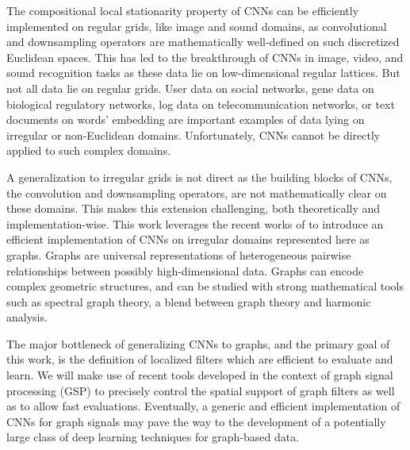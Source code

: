 \documentclass{article}
\begin{document}
The compositional local stationarity property of CNNs can be efficiently
implemented on regular grids, like image and sound domains, as convolutional and
downsampling operators are mathematically well-defined on such discretized
Euclidean spaces. This has led to the breakthrough of CNNs in image, video, and
sound recognition tasks \cite{art:LeCunBengioHinton15DL} as these data lie on
low-dimensional regular lattices. But not all data lie on regular grids. User
data on social networks, gene data on biological regulatory networks, log data
on telecommunication networks, or text documents on words' embedding are
important examples of data lying on irregular or non-Euclidean domains.
Unfortunately, CNNs cannot be directly applied to such complex domains.

A generalization to irregular grids is not direct as the building blocks of
CNNs, the convolution and downsampling operators, are not mathematically clear
on these domains. This makes this extension challenging, both theoretically and
implementation-wise. This work leverages the recent works of
\cite{pro:GregorLeCun10LRF, pro:CoatesNg11LRF,
art:BrunaZarembaSzlamLeCun13DLgraphs, art:HenaffBrunaLeCun15DLgraphs,
art:HammondVandergheynstGribonval11GraphWav,
art:ShumanNarangFrossardOrtegaVandergheynst13ReviewSPG} to introduce an
efficient implementation of CNNs on irregular domains represented here as
graphs. Graphs are universal representations of heterogeneous pairwise
relationships between possibly high-dimensional data. Graphs can encode complex
geometric structures, and can be studied with strong mathematical tools such as
spectral graph theory, a blend between graph theory and harmonic analysis.

The major bottleneck of generalizing CNNs to graphs, and the primary goal of
this work, is the definition of localized filters which are efficient to
evaluate and learn.
We will make use of recent tools developed in the context of graph signal
processing (GSP) \cite{art:ShumanNarangFrossardOrtegaVandergheynst13ReviewSPG}
to precisely control the spatial support of graph filters as well as to allow
fast evaluations. Eventually, a generic and efficient implementation of CNNs for
graph signals may pave the way to the development of a potentially large class
of deep learning techniques for graph-based data.
\end{document}
